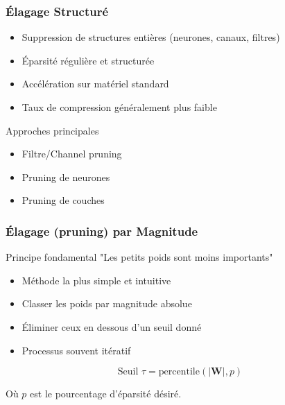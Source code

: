 \documentclass[10pt]{beamer}
\begin{document}
\begin{frame}
\frametitle{Élagage Structuré}
\begin{itemize}
    \item Suppression de structures entières (neurones, canaux, filtres)
    \item Éparsité régulière et structurée
    \item Accélération sur matériel standard
    \item Taux de compression généralement plus faible
\end{itemize}

\begin{block}{Approches principales}
\begin{itemize}
    \item Filtre/Channel pruning
    \item Pruning de neurones
    \item Pruning de couches
\end{itemize}
\end{block}
\end{frame}

\begin{frame}
\frametitle{Élagage (pruning) par Magnitude}
\begin{alertblock}{Principe fondamental}
"Les petits poids sont moins importants"
\end{alertblock}

\begin{itemize}
    \item Méthode la plus simple et intuitive
    \item Classer les poids par magnitude absolue
    \item Éliminer ceux en dessous d'un seuil donné
    \item Processus souvent itératif
\end{itemize}

\begin{equation}
\text{Seuil } \tau = \text{percentile}(|\mathbf{W}|, p)
\end{equation}

Où $p$ est le pourcentage d'éparsité désiré.
\end{frame}
\end{document}
